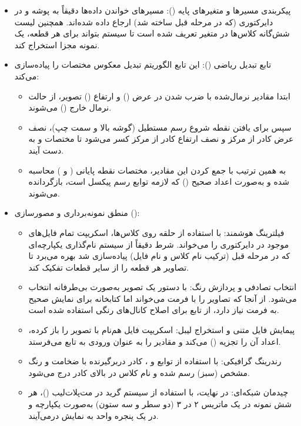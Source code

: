 \documentclass{article}
\begin{document}
\begin{itemize}
	\item پیکربندی مسیرها و متغیرهای پایه (): مسیرهای خواندن داده‌ها دقیقاً به پوشه  و  در دایرکتوری  (که در مرحله قبل ساخته شد) ارجاع داده شده‌اند. همچنین لیست شش‌گانه کلاس‌ها در متغیر  تعریف شده است تا سیستم بتواند برای هر قطعه، یک نمونه مجزا استخراج کند.
	\item تابع تبدیل ریاضی (): این تابع الگوریتم تبدیل معکوس مختصات را پیاده‌سازی می‌کند:
	\begin{itemize}
		\item ابتدا مقادیر نرمال‌شده  با ضرب شدن در عرض () و ارتفاع () تصویر، از حالت نرمال خارج () می‌شوند.
		\item سپس برای یافتن نقطه شروع رسم مستطیل (گوشه بالا و سمت چپ)، نصف عرض کادر از مرکز  و نصف ارتفاع کادر از مرکز  کسر می‌شود تا مختصات  و  به دست آیند.
		\item به همین ترتیب با جمع کردن این مقادیر، مختصات نقطه پایانی ( و ) محاسبه شده و به‌صورت اعداد صحیح () که لازمه توابع رسم پیکسل است، بازگردانده می‌شوند.
	\end{itemize}
	\item منطق نمونه‌برداری و مصورسازی ():
	\begin{itemize}
		\item فیلترینگ هوشمند: با استفاده از حلقه  روی کلاس‌ها، اسکریپت تمام فایل‌های موجود در دایرکتوری را می‌خواند. شرط  دقیقاً از سیستم نام‌گذاری یکپارچه‌ای که در مرحله قبل (ترکیب نام کلاس و نام فایل) پیاده‌سازی شد بهره می‌برد تا تصاویر هر قطعه را از سایر قطعات تفکیک کند.
		\item انتخاب تصادفی و پردازش رنگ: با دستور  یک تصویر به‌صورت بی‌طرفانه انتخاب می‌شود. از آنجا که  تصاویر را با فرمت  می‌خواند اما کتابخانه  برای نمایش صحیح به فرمت  نیاز دارد، از تابع  برای اصلاح کانال‌های رنگی استفاده شده است.
		\item پیمایش فایل متنی و استخراج لیبل: اسکریپت فایل  هم‌نام با تصویر را باز کرده، اعداد آن را تجزیه () می‌کند و مقادیر را به عنوان ورودی به تابع  می‌فرستد.
		\item رندرینگ گرافیکی: با استفاده از توابع  و ، کادر دربرگیرنده با ضخامت و رنگ مشخص (سبز) رسم شده و نام کلاس در بالای کادر درج می‌شود.
		\item چیدمان شبکه‌ای: در نهایت، با استفاده از سیستم گرید در مت‌پلات‌لیب ()، هر شش نمونه در یک ماتریس ۲ در ۳ (دو سطر و سه ستون) به‌صورت یکپارچه و در یک پنجره واحد به نمایش درمی‌آیند.
	\end{itemize}
\end{itemize}
\end{document}
